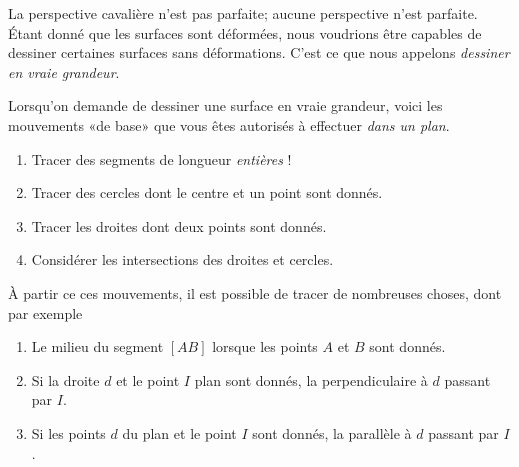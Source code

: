 La perspective cavalière n'est pas parfaite; aucune perspective n'est parfaite. Étant donné que les surfaces sont déformées, nous voudrions être capables de dessiner certaines surfaces sans déformations. C'est ce que nous appelons \emph{dessiner en vraie grandeur}.

\begin{Aretenir}
    Lorsqu'on demande de dessiner une surface en vraie grandeur, voici les mouvements «de base» que vous êtes autorisés à effectuer \emph{dans un plan}.
    \begin{enumerate}
        \item
            Tracer des segments de longueur \emph{entières} !
        \item
            Tracer des cercles dont le centre et un point sont donnés.
        \item
            Tracer les droites dont deux points sont donnés.
        \item
            Considérer les intersections des droites et cercles.
    \end{enumerate}
    À partir ce ces mouvements, il est possible de tracer de nombreuses choses, dont par exemple
    \begin{enumerate}
        \item
            Le milieu du segment \( [AB]\) lorsque les points \( A\) et \( B\) sont donnés.
        \item
            Si la droite \( d\) et le point \( I\) plan sont donnés, la perpendiculaire à \( d\) passant par \( I\).
        \item
            Si les points \( d\) du plan et le point \( I\) sont donnés, la parallèle à \( d\) passant par \( I\).
    \end{enumerate}
\end{Aretenir}

